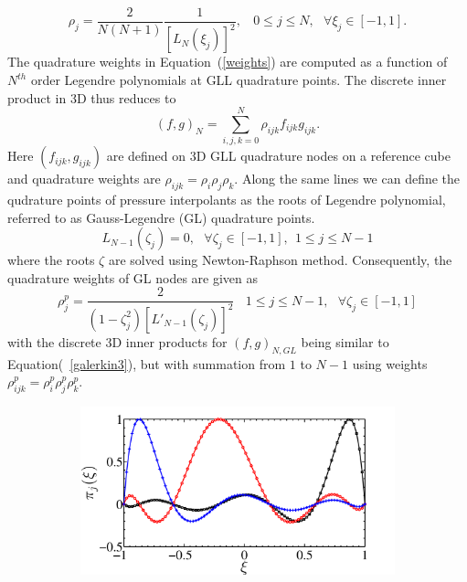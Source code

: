 \documentclass[times]{fldauth}
\begin{document}
\begin{appendices}
 \begin{equation}
 \rho_j = \frac{2}{N(N+1)}\frac{1}{[L_N(\xi_j)]^2}, \ \ \ \ 0 \le j\le N, \ \ \ \forall \xi_j\in [-1,1]. \label{weights}
 \end{equation}
 The quadrature weights in Equation~(\ref{weights}) are computed as a function of $N^{th}$ order Legendre polynomials at GLL quadrature points. The discrete inner product in 3D thus reduces to
\begin{equation}
(f,g)_{N} = \sum_{i,j,k=0}^{N}\rho_{ijk}f_{ijk}g_{ijk}.\label{galerkin3}
\end{equation}
Here $(f_{ijk},g_{ijk})$ are defined on 3D GLL quadrature nodes on a reference cube and quadrature weights are $\rho_{ijk} = \rho_{i}\rho_{j}\rho_{k}$.
Along the same lines we can define the qudrature points of pressure interpolants as the roots of Legendre polynomial, referred to as Gauss-Legendre (GL) quadrature points.
\begin{equation}
L_{N-1}(\zeta_j) = 0, \ \ \ \forall \zeta_j \in [-1, 1], \ \ 1\le j\le N-1 \label{GL}
\end{equation}
where the roots $\zeta$ are solved using Newton-Raphson method. Consequently, the quadrature weights of GL nodes are given as 
\begin{equation}
\rho^{p}_j = \frac{2}{(1 - \zeta_j^{2})[L'_{N-1}(\zeta_j)]^{2}} \ \ \ \ 1 \le j\le N-1, \ \ \ \forall \zeta_j\in [-1,1]
\end{equation}
with the discrete 3D inner products for $(f,g)_{N,GL}$ being similar to Equation(~\ref{galerkin3}), but with summation from $1$ to $N-1$ using weights $\rho^{p}_{ijk} = \rho^{p}_{i}\rho^{p}_{j}\rho^{p}_{k}$.
\begin{figure}
\centering
        \begin{subfigure}[b]{0.65\textwidth}
                \includegraphics[width=\linewidth]{Figure/legpoly2.pdf}

\end{subfigure}
\end{figure}
\end{appendices}
\end{document}
